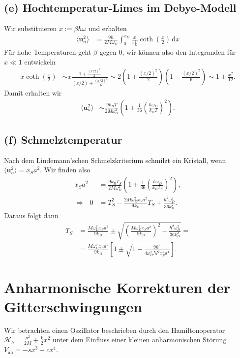 \documentclass[english, parskip=full]{scrartcl}
\renewcommand{\bra}{}
\newcommand{\intx}{}
\newcommand{\kla}{}
\newcommand{\klam}{}
\newcommand{\tecxt}{}
\begin{document}
\subsection*{(e) Hochtemperatur-Limes im Debye-Modell}
Wir substituieren $x := \beta\hbar\omega$ und erhalten
\begin{align}
\bra\langle \textbf{u}_n^2 \rangle &= \frac{9\hbar}{2M\omega_D} \intx\int_{0}^{x_D} \frac{x}{x_D^2} \coth\kla\left( \frac{x}{2} \right)  \, \mathrm{d}x
\end{align}
Für hohe Temperaturen geht $\beta$ gegen 0, wir können also den Integranden für $x\ll 1$ entwickeln
\begin{align}
x\coth\kla\left( \frac{x}{2} \right) &\sim x \frac{1 + \frac{(x/2)^2}{2}}{(x/2) + \frac{(x/2)^3}{6}} \sim 2\kla\left( 1 + \frac{(x/2)^2}{2} \right)\kla\left( 1 - \frac{(x/2)^2}{6} \right) \sim 1 + \frac{x^2}{12} .
\end{align}
Damit erhalten wir
\begin{align}
\bra\langle \textbf{u}_n^2 \rangle &\sim \frac{9k_BT}{2M\omega_D^2} \kla\left( 1 + \frac{1}{36} \kla\left( \frac{\hbar\omega_D}{k_BT} \right)^2 \right).
\end{align}
\subsection*{(f) Schmelztemperatur}
Nach dem Lindemann'schen Schmelzkriterium schmilzt ein Kristall, wenn $\bra\langle \textbf{u}_n^2 \rangle = x_Sa^2$.
Wir finden also 
\begin{align}
x_Sa^2 &= \frac{9k_BT_S}{2M\omega_D^2} \kla\left( 1 + \frac{1}{36} \kla\left( \frac{\hbar\omega_D}{k_BT_S} \right)^2 \right),\\
\Rightarrow\ \ \ 0 &= T_S^2 - \frac{2M\omega_D^2x_Sa^2}{9k_B} T_S + \frac{\hbar^2\omega_D^2}{36k_B^2}.
\end{align}
Daraus folgt dann
\begin{align}
T_S &= \frac{M\omega_D^2x_Sa^2}{9k_B} \pm \sqrt{\kla\left( \frac{M\omega_D^2x_Sa^2}{9k_B} \right)^2 - \frac{\hbar^2\omega_D^2}{36k_B^2}} = \\
&= \frac{M\omega_D^2x_Sa^2}{9k_B}\klam\left[ 1 \pm \sqrt{1 - \frac{9\hbar^2}{4\omega_D^2M^2x_S^2a^4}} \right].
\end{align}

\section{Anharmonische Korrekturen der Gitterschwingungen}
Wir betrachten einen Oszillator beschrieben durch den Hamiltonoperator $\mathcal{H}_h = \frac{p^2}{2M} + \frac{k}{2}x^2$ unter dem Einfluss einer kleinen anharmonischen Störung $V_\tecxt\text{ah} = -sx^3 - cx^4$.
\end{document}

